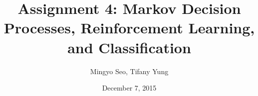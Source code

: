 \documentclass[10pt,letterpaper]{article}
\begin{document}
\setlength{\parskip}{1em}

\title{Assignment 4: Markov Decision Processes, Reinforcement Learning, and Classification}
\author{Mingyo Seo, Tifany Yung}
\date{December 7, 2015\vspace{-2ex}}
\maketitle




\end{document}
